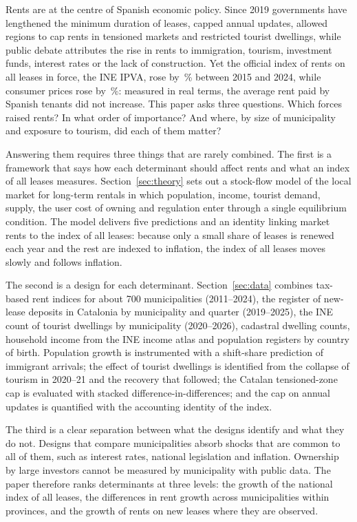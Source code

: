 \documentclass[11pt,a4paper]{article}
\begin{document}
Rents are at the centre of Spanish economic policy. Since 2019 governments have lengthened the minimum duration of leases, capped annual updates, allowed regions to cap rents in tensioned markets and restricted tourist dwellings, while public debate attributes the rise in rents to immigration, tourism, investment funds, interest rates or the lack of construction. Yet the official index of rents on all leases in force, the INE IPVA, rose by \ipvaGrowth\,\% between 2015 and 2024, while consumer prices rose by \cpiGrowth\,\%: measured in real terms, the average rent paid by Spanish tenants did not increase. This paper asks three questions. Which forces raised rents? In what order of importance? And where, by size of municipality and exposure to tourism, did each of them matter?

Answering them requires three things that are rarely combined. The first is a framework that says how each determinant should affect rents and what an index of all leases measures. Section~\ref{sec:theory} sets out a stock-flow model of the local market for long-term rentals in which population, income, tourist demand, supply, the user cost of owning and regulation enter through a single equilibrium condition. The model delivers five predictions and an identity linking market rents to the index of all leases: because only a small share of leases is renewed each year and the rest are indexed to inflation, the index of all leases moves slowly and follows inflation.

The second is a design for each determinant. Section~\ref{sec:data} combines tax-based rent indices for about 700 municipalities (2011--2024), the register of new-lease deposits in Catalonia by municipality and quarter (2019--2025), the INE count of tourist dwellings by municipality (2020--2026), cadastral dwelling counts, household income from the INE income atlas and population registers by country of birth. Population growth is instrumented with a shift-share prediction of immigrant arrivals; the effect of tourist dwellings is identified from the collapse of tourism in 2020--21 and the recovery that followed; the Catalan tensioned-zone cap is evaluated with stacked difference-in-differences; and the cap on annual updates is quantified with the accounting identity of the index.

The third is a clear separation between what the designs identify and what they do not. Designs that compare municipalities absorb shocks that are common to all of them, such as interest rates, national legislation and inflation. Ownership by large investors cannot be measured by municipality with public data. The paper therefore ranks determinants at three levels: the growth of the national index of all leases, the differences in rent growth across municipalities within provinces, and the growth of rents on new leases where they are observed.
\end{document}

